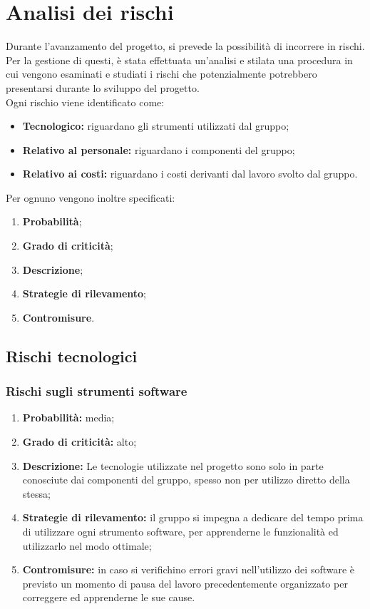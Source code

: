 \section{Analisi dei rischi}
Durante l’avanzamento del progetto, si prevede la possibilità di incorrere in rischi. Per la gestione di questi, è stata effettuata un’analisi e stilata una procedura in cui vengono esaminati e studiati i rischi che potenzialmente potrebbero presentarsi durante lo sviluppo del progetto. \\
Ogni rischio viene identificato come:
\begin{itemize}
\item \textbf{Tecnologico:} riguardano gli strumenti utilizzati dal gruppo;
\item \textbf{Relativo al personale:} riguardano i componenti del gruppo;
\item \textbf{Relativo ai costi:} riguardano i costi derivanti dal lavoro svolto dal gruppo.
\end{itemize}
Per ognuno vengono inoltre specificati:
\begin{enumerate}
	\item \textbf{Probabilità};
	\item \textbf{Grado di criticità};
	\item \textbf{Descrizione};
	\item \textbf{Strategie di rilevamento};
	\item \textbf{Contromisure}.
\end{enumerate}

\subsection{Rischi tecnologici}
\subsubsection{Rischi sugli strumenti software}
\begin{enumerate}
	\item \textbf{Probabilità:} media;
	\item \textbf{Grado di criticità:} alto;
	\item \textbf{Descrizione:} Le tecnologie utilizzate nel progetto sono solo in parte conosciute dai componenti del gruppo, spesso non per utilizzo diretto della stessa;
	\item \textbf{Strategie di rilevamento:} il gruppo si impegna a dedicare del tempo prima di utilizzare ogni strumento software, per apprenderne le funzionalità ed utilizzarlo nel modo ottimale;
	\item \textbf{Contromisure:} in caso si verifichino errori gravi nell'utilizzo dei software è previsto un momento di pausa del lavoro precedentemente organizzato per correggere ed apprenderne le sue cause.
\end{enumerate}


